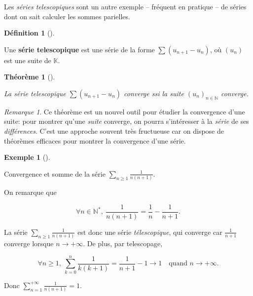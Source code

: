 \documentclass[
  french,
  letterpaper,
  DIV=11,
  numbers=noendperiod]{scrreprt}
\theoremstyle{plain}
\theoremstyle{definition}
\newtheorem{definition}{Définition}[chapter]
\theoremstyle{plain}
\theoremstyle{plain}
\newtheorem{theorem}{Théorème}[chapter]
\theoremstyle{definition}
\theoremstyle{definition}
\newtheorem{example}{Exemple}[chapter]
\theoremstyle{plain}
\theoremstyle{remark}
\newtheorem{refremark}{Remarque}[chapter]
\begin{document}
Les \emph{séries telescopiques} sont un autre exemple -- fréquent en
pratique -- de séries dont on sait calculer les sommes parielles.

\begin{definition}[]\protect\hypertarget{def-serie-telescopique}{}\label{def-serie-telescopique}

Une \textbf{série telescopique} est une série de la forme
\(\sum (u_{n+1}-u_n)\), où \((u_{n})\) est une suite de \(\mathbb{K}\).

\end{definition}

\begin{theorem}[]\protect\hypertarget{thm-serie-telescopique}{}\label{thm-serie-telescopique}

La série telescopique \(\sum (u_{n+1}-u_{n})\) converge ssi la
\emph{suite} \((u_{n})_{n
\in \mathbb{N}}\) converge.

\end{theorem}

\begin{refremark}
Ce théorème est un nouvel outil pour étudier la convergence d'une suite:
pour montrer qu'une \emph{suite} converge, on pourra s'intéresser à la
\emph{série} de ses \emph{différences}. C'est une approche souvent très
fructueuse car on dispose de théorèmes efficaces pour montrer la
convergence d'une série.

\label{rem-nouvel-outil}

\end{refremark}

\begin{example}[]\protect\hypertarget{exm-telescopique}{}\label{exm-telescopique}

Convergence et somme de la série
\(\sum_{n\geqslant 1}\frac{1}{n(n+1)}\).

On remarque que

\[
    \forall n \in \mathbb{N}^{*},\ \frac{1}{n(n+1)} =
\frac{1}{n}-\frac{1}{n+1}.
\]

La série \(\sum_{n \geqslant 1}\frac{1}{n(n+1)}\) est donc une série
\emph{télescopique}, qui converge car \(\frac{1}{n+1}\) converge lorsque
\(n
\to +\infty\). De plus, par telescopage,

\[
\forall n \geqslant 1,\ \sum_{k=0}^{n}\frac{1}{k(k+1)} = \frac{1}{n+1}-
1 \to 1 \quad \text{quand $n \to +\infty$.}
\]

Donc \(\displaystyle\sum_{n=1}^{+\infty}\frac{1}{n(n+1)}=1\).

\end{example}
\end{document}
